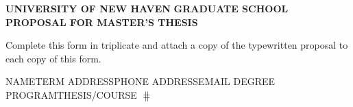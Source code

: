 \documentclass{article}
\begin{document}
\begin{center}
\textbf{UNIVERSITY OF NEW HAVEN}\linebreak
\textbf{GRADUATE SCHOOL}\linebreak\linebreak
\textbf{PROPOSAL FOR MASTER'S THESIS}\linebreak
\end{center}

\begin{flushleft}
Complete this form in triplicate and attach a copy of the typewritten proposal to each copy of this form.\linebreak
\end{flushleft}

\begin{flushleft}
NAME\hspace{1cm}\underline{\hfill{\hspace{6.5cm}}}\hspace{0.5cm}TERM\hspace{0.6cm}\underline{\hfill{\hspace{4.3cm}}}\linebreak
ADDRESS\hspace{0.4cm}\underline{\hfill{\hspace{6.5cm}}}\hspace{0.5cm}PHONE\hspace{0.4cm}\underline{\hfill{\hspace{4.3cm}}}\linebreak
{\color{white} ADDRESS}\hspace{0.4cm}\underline{\hfill{\hspace{6.5cm}}}\hspace{0.5cm}EMAIL\hspace{0.5cm}\underline{\hfill{\hspace{4.3cm}}}\linebreak \linebreak
DEGREE PROGRAM\hspace{0.4cm}\underline{\hfill{\hspace{4cm}}}\hspace{0.3cm}THESIS/COURSE $\hash$ \hspace{0.1cm}\underline{\hfill{\hspace{3.3cm}}}
\end{flushleft}
\end{document}
